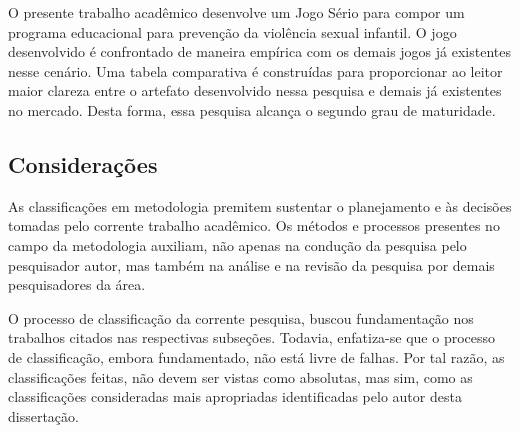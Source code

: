 O presente trabalho acadêmico desenvolve um Jogo Sério para compor um programa educacional para prevenção da violência sexual infantil. O jogo desenvolvido é confrontado de maneira empírica com os demais jogos já existentes nesse cenário. Uma tabela comparativa é construídas para proporcionar ao leitor maior clareza entre o artefato desenvolvido nessa pesquisa e demais já existentes no mercado. Desta forma, essa pesquisa alcança o segundo grau de maturidade. 




\vspace{-0.13cm}


\subsection{Considerações}\label{sub:considerar}

As classificações em metodologia premitem sustentar o planejamento e às decisões tomadas pelo corrente trabalho acadêmico. Os métodos e processos presentes no campo da metodologia auxiliam, não apenas na condução da pesquisa pelo pesquisador autor, mas também na análise e na revisão da pesquisa por demais pesquisadores da área.

O processo de classificação da corrente pesquisa, buscou fundamentação nos trabalhos citados nas respectivas subseções. Todavia, enfatiza-se que o processo de classificação, embora fundamentado, não está livre de falhas. Por tal razão, as classificações feitas, não devem ser vistas como absolutas, mas sim, como as classificações consideradas mais apropriadas identificadas pelo autor desta dissertação. 




